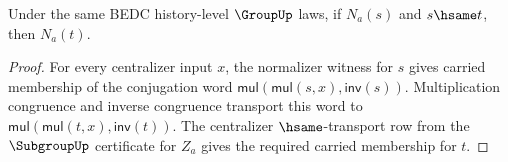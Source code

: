 \begin{theorem}
\label{thm:subgroup-centralizer-normalizer-hsame-transport}
Under the same BEDC history-level $\GroupUp$ laws, if $N_a(s)$ and
$s\hsame t$, then $N_a(t)$.
\end{theorem}
\begin{proof}
For every centralizer input $x$, the normalizer witness for $s$ gives carried
membership of the conjugation word
$\mathsf{mul}(\mathsf{mul}(s,x),\mathsf{inv}(s))$. Multiplication congruence
and inverse congruence transport this word to
$\mathsf{mul}(\mathsf{mul}(t,x),\mathsf{inv}(t))$. The centralizer
$\hsame$-transport row from the $\SubgroupUp$ certificate for $Z_a$ gives the
required carried membership for $t$.
\end{proof}

